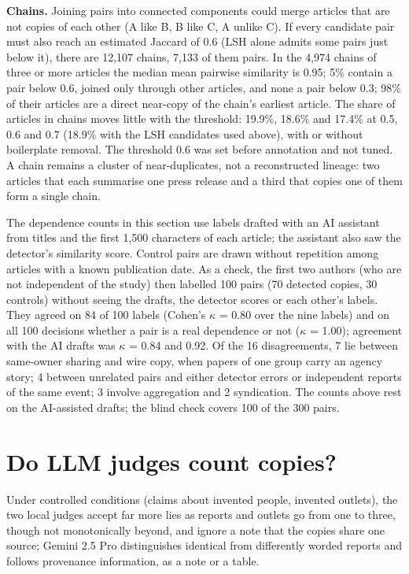 \textbf{Chains.} Joining pairs into connected components could merge articles that are not copies of each other (A like B, B like C, A unlike C). If every candidate pair must also reach an estimated Jaccard of 0.6 (LSH alone admits some pairs just below it), there are 12,107 chains, 7,133 of them pairs. In the 4,974 chains of three or more articles the median mean pairwise similarity is 0.95; 5\% contain a pair below 0.6, joined only through other articles, and none a pair below 0.3; 98\% of their articles are a direct near-copy of the chain's earliest article. The share of articles in chains moves little with the threshold: 19.9\%, 18.6\% and 17.4\% at 0.5, 0.6 and 0.7 (18.9\% with the LSH candidates used above), with or without boilerplate removal. The threshold 0.6 was set before annotation and not tuned. A chain remains a cluster of near-duplicates, not a reconstructed lineage: two articles that each summarise one press release and a third that copies one of them form a single chain.

The dependence counts in this section use labels drafted with an AI assistant from titles and the first 1,500 characters of each article; the assistant also saw the detector's similarity score. Control pairs are drawn without repetition among articles with a known publication date. As a check, the first two authors (who are not independent of the study) then labelled 100 pairs (70 detected copies, 30 controls) without seeing the drafts, the detector scores or each other's labels. They agreed on 84 of 100 labels (Cohen's $\kappa$ = 0.80 over the nine labels) and on all 100 decisions whether a pair is a real dependence or not ($\kappa$ = 1.00); agreement with the AI drafts was $\kappa$ = 0.84 and 0.92. Of the 16 disagreements, 7 lie between same-owner sharing and wire copy, when papers of one group carry an agency story; 4 between unrelated pairs and either detector errors or independent reports of the same event; 3 involve aggregation and 2 syndication. The counts above rest on the AI-assisted drafts; the blind check covers 100 of the 300 pairs.

\section{Do LLM judges count copies?}\label{sec:judges}

Under controlled conditions (claims about invented people, invented outlets), the two local judges accept far more lies as reports and outlets go from one to three, though not monotonically beyond, and ignore a note that the copies share one source; Gemini 2.5 Pro distinguishes identical from differently worded reports and follows provenance information, as a note or a table.

